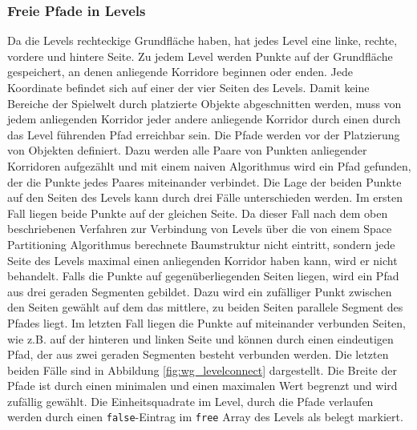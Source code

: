 \subsubsection{Freie Pfade in Levels}
Da die Levels rechteckige Grundfläche haben, hat jedes Level eine linke, rechte, vordere und hintere Seite. Zu jedem Level werden Punkte auf der Grundfläche gespeichert, an denen anliegende Korridore beginnen oder enden. Jede Koordinate befindet sich auf einer der vier Seiten des Levels. Damit keine Bereiche der Spielwelt durch platzierte Objekte abgeschnitten werden, muss von jedem anliegenden Korridor jeder andere anliegende Korridor durch einen durch das Level führenden Pfad erreichbar sein. Die Pfade  werden vor der Platzierung von Objekten definiert. Dazu werden alle Paare von Punkten anliegender Korridoren aufgezählt und mit einem naiven Algorithmus wird ein Pfad gefunden, der die Punkte jedes Paares miteinander verbindet. Die Lage der beiden Punkte auf den Seiten des Levels kann durch drei Fälle unterschieden werden. Im ersten Fall liegen beide Punkte auf der gleichen Seite. Da dieser Fall nach dem oben beschriebenen Verfahren zur Verbindung von Levels über die von einem Space Partitioning Algorithmus berechnete Baumstruktur nicht eintritt, sondern jede Seite des Levels maximal einen anliegenden Korridor haben kann, wird er nicht behandelt. Falls die Punkte auf gegenüberliegenden Seiten liegen, wird ein Pfad aus drei geraden Segmenten gebildet. Dazu wird ein zufälliger Punkt zwischen den Seiten gewählt auf dem das mittlere, zu beiden Seiten parallele Segment des Pfades liegt. Im letzten Fall liegen die Punkte auf miteinander verbunden Seiten, wie z.B. auf der hinteren und linken Seite und können durch einen eindeutigen Pfad, der aus zwei geraden Segmenten besteht verbunden werden. Die letzten beiden Fälle sind in Abbildung \ref{fig:wg_levelconnect} dargestellt. Die Breite der Pfade ist durch einen minimalen und einen maximalen Wert begrenzt und wird zufällig gewählt. Die Einheitsquadrate im Level, durch die Pfade verlaufen werden durch einen \texttt{false}-Eintrag im \texttt{free} Array des Levels als belegt markiert.
